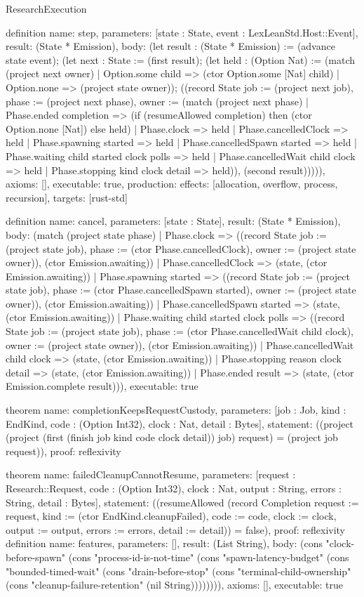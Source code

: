 \begin{lexlean}{ResearchExecution}
\begin{semanticmodule}
definition{
  name: step,
  parameters: [state : State, event : LexLeanStd.Host::Event],
  result: (State * Emission),
  body: (let result : (State * Emission) := (advance state event); (let next : State := (first result); (let held : (Option Nat) := (match (project next owner) | Option.some child => (ctor Option.some [Nat] child) | Option.none => (project state owner)); ((record State {job := (project next job), phase := (project next phase), owner := (match (project next phase) | Phase.ended completion => (if (resumeAllowed completion) then (ctor Option.none [Nat]) else held) | Phase.clock => held | Phase.cancelledClock => held | Phase.spawning started => held | Phase.cancelledSpawn started => held | Phase.waiting child started clock polls => held | Phase.cancelledWait child clock => held | Phase.stopping kind clock detail => held)}), (second result))))),
  axioms: [],
  executable: true,
  production: {effects: [allocation, overflow, process, recursion], targets: [rust-std]}
}

definition{
  name: cancel,
  parameters: [state : State],
  result: (State * Emission),
  body: (match (project state phase)
    | Phase.clock => ((record State {job := (project state job), phase := (ctor Phase.cancelledClock), owner := (project state owner)}), (ctor Emission.awaiting))
    | Phase.cancelledClock => (state, (ctor Emission.awaiting))
    | Phase.spawning started => ((record State {job := (project state job), phase := (ctor Phase.cancelledSpawn started), owner := (project state owner)}), (ctor Emission.awaiting))
    | Phase.cancelledSpawn started => (state, (ctor Emission.awaiting))
    | Phase.waiting child started clock polls => ((record State {job := (project state job), phase := (ctor Phase.cancelledWait child clock), owner := (project state owner)}), (ctor Emission.awaiting))
    | Phase.cancelledWait child clock => (state, (ctor Emission.awaiting))
    | Phase.stopping reason clock detail => (state, (ctor Emission.awaiting))
    | Phase.ended result => (state, (ctor Emission.complete result))),
  executable: true
}


theorem{
  name: completionKeepsRequestCustody,
  parameters: [job : Job, kind : EndKind, code : (Option Int32), clock : Nat, detail : Bytes],
  statement: ((project (project (first (finish job kind code clock detail)) job) request) = (project job request)),
  proof: reflexivity{}
}

theorem{
  name: failedCleanupCannotResume,
  parameters: [request : Research::Request, code : (Option Int32), clock : Nat, output : String, errors : String, detail : Bytes],
  statement: ((resumeAllowed (record Completion {request := request, kind := (ctor EndKind.cleanupFailed), code := code, clock := clock, output := output, errors := errors, detail := detail})) = false),
  proof: reflexivity{}
}
definition{
  name: features,
  parameters: [],
  result: (List String),
  body: (cons "clock-before-spawn" (cons "process-id-is-not-time" (cons "spawn-latency-budget" (cons "bounded-timed-wait" (cons "drain-before-stop" (cons "terminal-child-ownership" (cons "cleanup-failure-retention" (nil String)))))))),
  axioms: [],
  executable: true
}


\end{semanticmodule}
\end{lexlean}
